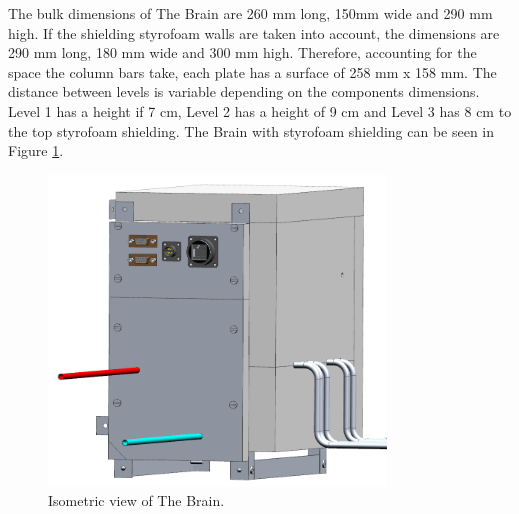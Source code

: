 



\smallskip
The bulk dimensions of The Brain are 260 mm long, 150mm wide and 290 mm high. If the shielding styrofoam walls are taken into account, the dimensions are 290 mm long, 180 mm wide and 300 mm high.
Therefore, accounting for the space the column bars take, each plate has a surface of 258 mm x 158 mm. The distance between levels is variable depending on the components dimensions. Level 1 has a height if 7 cm, Level 2 has a height of 9 cm and Level 3 has 8 cm to the top styrofoam shielding. The Brain with styrofoam shielding can be seen in Figure \ref{brain_isometric}.

\begin{figure}[H]
    \centering
    \includegraphics[width=0.8\textwidth]{4-experiment-design/img/Mechanical/Brain_Isometric.png}
    \caption{Isometric view of The Brain.}
    \label{brain_isometric}
\end{figure}

